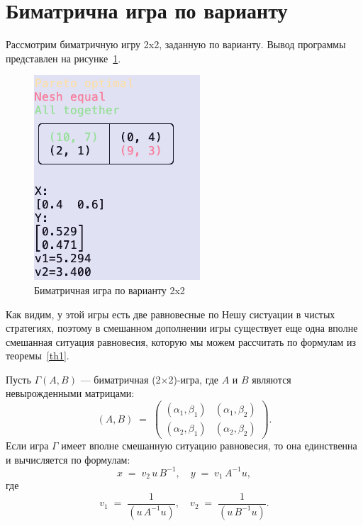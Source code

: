 \section{Биматрична игра по варианту}

Рассмотрим биматричную игру 2x2, заданную по варианту. Вывод программы представлен на
рисунке~\ref{fig:fig05}.

\begin{figure}
  \centering
  \includegraphics[scale=0.7]{../../artifacts/lw3/variant_game.png}
  \caption{Биматричная игра по варианту 2x2}
  \label{fig:fig05}
\end{figure}

Как видим, у этой игры есть две равновесные по Нешу систуации в чистых стратегиях,
поэтому в смешанном дополнении игры существует еще одна вполне смешанная ситуация
равновесия, которую мы можем рассчитать по формулам из теоремы~\ref{th1}.

\begin{theorem}\label{th1}
Пусть $\Gamma(A,B)$ --- биматричная (2$\times$2)-игра, где $A$ и $B$ 
являются невырожденными матрицами:
\[
(A, B) \;=\;
\begin{pmatrix}
(\alpha_1, \beta_1) & (\alpha_1, \beta_2)\\
(\alpha_2, \beta_1) & (\alpha_2, \beta_2)
\end{pmatrix}.
\]
Если игра $\Gamma$ имеет вполне смешанную ситуацию равновесия, 
то она единственна и вычисляется по формулам:
\[
x \;=\; v_2\,u\,B^{-1}, 
\quad 
y \;=\; v_1\,A^{-1}u,
\]
где
\[
v_1 \;=\; \frac{1}{(u\,A^{-1}u)},
\quad
v_2 \;=\; \frac{1}{(u\,B^{-1}u)}.
\]

\end{theorem}
